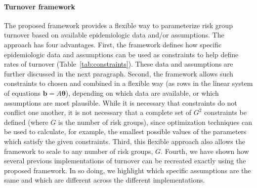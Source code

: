 \paragraph{Turnover framework}
The proposed framework provides a flexible way to parameterize risk group turnover
based on available epidemiologic data and/or assumptions.
The approach has four advantages.
First, the framework defines how specific epidemiologic data and assumptions
can be used as constraints to help define rates of turnover
(Table~\ref{tab:constraints}).
These data and assumptions are further discussed in the next paragraph.
Second, the framework allows such constraints to chosen and combined in a flexible way
(as rows in the linear system of equations $\bm{b} = A\bm{\theta}$),
depending on which data are available, or which assumptions are most plausible.
While it is necessary that constraints do not conflict one another,
it is not necessary that a complete set of $G^2$ constraints be defined
(where $G$ is the number of risk groups),
since optimization techniques can be used to calculate, for example,
the smallest possible values of the parameters which satisfy the given constraints.
Third, this flexible approach also allows the framework to scale
to any number of risk groups, $G$.
Fourth, we have shown how several previous implementations of turnover
\citep{Stigum1994,Eaton2014,Henry2015}
can be recreated exactly using the proposed framework.
In so doing, we highlight which specific assumptions are
the same and which are different
across the different implementations.
